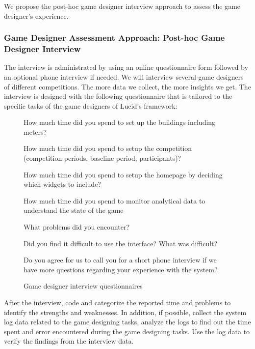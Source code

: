 \documentclass[11pt,oneside]{book}
\begin{document}
We propose the post-hoc game designer interview approach to assess the game designer's experience.

\subsubsection{Game Designer Assessment Approach: Post-hoc Game Designer Interview}
\label{Post-hoc game designer interview}

 The interview is administrated by using an online questionnaire form followed by an optional phone interview if needed. We will interview several game designers of different competitions. The more data we collect, the more insights we get. The interview is designed with the following questionnaire that is tailored to the specific tasks of the game designers of Lucid's framework:

\begin{figure}[ht!]
\begin{mybox}
\begin{compactenum}
\item How much time did you spend to set up the buildings including meters?
\item How much time did you spend to setup the competition (competition periods, baseline period, participants)?
\item How much time did you spend to setup the homepage by deciding which widgets to include?
\item How much time did you spend to monitor analytical data to understand the state of the game
\item What problems did you encounter?
\item Did you find it difficult to use the interface? What was difficult?
\item Do you agree for us to call you for a short phone interview if we have more questions regarding your experience with the system?
\end{compactenum}
\end{mybox}
\caption{Game designer interview questionnaires}
\label{fig:game-designer-interview}  
\end{figure}

After the interview, code and categorize the reported time and problems to identify the strengths and weaknesses. In addition, if possible, collect the system log data related to the game designing tasks, analyze the logs to find out the time spent and error encountered during the game designing tasks. Use the log data to verify the findings from the interview data.
\end{document}
